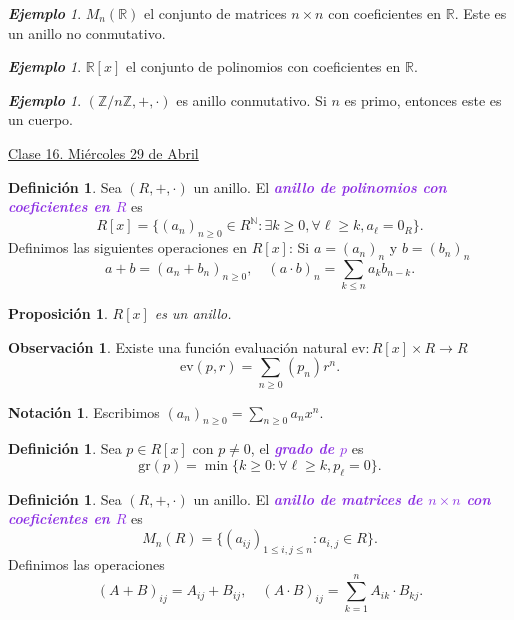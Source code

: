 \documentclass{article}
\newtheorem{proposition}[theorem]{Proposición}
\theoremstyle{definition}
\newtheorem{definition}[theorem]{Definición}
\newtheorem*{notation}{Notación}
\newtheorem*{obs}{Observación}
\theoremstyle{remark}
\newtheorem{example}[theorem]{\textbf{Ejemplo}}
\numberwithin{equation}{section}
\newcommand{\N}{\mathbb{N}}
\newcommand{\R}{\mathbb{R}}
\newcommand{\Z}{\mathbb{Z}}
\renewcommand{\c}{\cdot}
\newcommand{\gr}{\mathrm{gr}}
\newcommand{\zmz}[1]{\Z/ #1 \Z}
\newcommand{\wea}[1]{\textcolor{BlueViolet}{\textbf{\emph{#1}}}}
\newcommand{\fecha}[1]{\begin{flushright} \underline{#1} \end{flushright}}
\begin{document}
\begin{example}
  $M_n(\R)$ el conjunto de matrices $n \times n$ con coeficientes en $\R$. Este es un anillo no conmutativo.
\end{example}

\begin{example}
  $\R[x]$ el conjunto de polinomios con coeficientes en $\R$.
\end{example}

\begin{example}
  $(\zmz n,+,\c)$ es anillo conmutativo. Si $n$ es primo, entonces este es un cuerpo.
\end{example}

\fecha{Clase 16. Miércoles 29 de Abril}

\begin{definition}
  Sea $(R,+,\c)$ un anillo. El \wea{anillo de polinomios con coeficientes en $R$} es 
  \[ R[x] = \{(a_n)_{n \geq 0} \in R^\N \colon \exists k \geq 0, \forall \ell \geq k, a_\ell = 0_R\}. \]
  Definimos las siguientes operaciones en $R[x]$: Si $a = (a_n)_n$ y $b = (b_n)_n$
  \[ a + b = (a_n + b_n)_{n \geq 0}, \quad (a \c b)_n = \sum_{k \leq n} a_k b_{n-k}. \]
\end{definition}

\begin{proposition}
  $R[x]$ es un anillo.
\end{proposition}

\begin{obs}
  Existe una función evaluación natural $\mathrm{ev} \colon R[x] \times R \to R$ 
  \[ \mathrm{ev}(p,r) = \sum_{n \geq 0} (p_n) r^n. \]
\end{obs}

\begin{notation}
  Escribimos $(a_n)_{n \geq 0} = \sum_{n \geq 0} a_n x^n$.
\end{notation}

\begin{definition}
  Sea $p \in R[x]$ con $p \neq 0$, el \wea{grado de $p$} es 
  \[ \gr(p) = \min\{k \geq 0 \colon \forall \ell \geq k, p_\ell = 0\}. \]
\end{definition}

\begin{definition}
  Sea $(R,+,\c)$ un anillo. El \wea{anillo de matrices de $n \times n$ con coeficientes en $R$} es
  $$M_n(R) = \{(a_{ij})_{1 \leq i,j \leq n} \colon a_{i,j} \in R\}.$$
  Definimos las operaciones 
  \[ (A + B)_{ij} = A_{ij} + B_{ij}, \quad (A \c B)_{ij} = \sum_{k=1}^n A_{ik} \c B_{kj}. \]
\end{definition}
\end{document}
